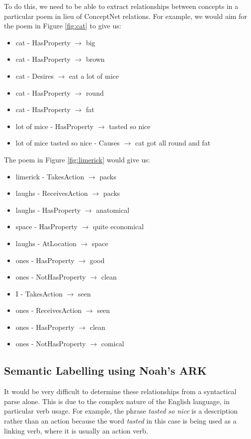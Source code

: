 To do this, we need to be able to extract relationships between concepts in a particular poem in lieu of ConceptNet relations. For example, we would aim for the poem in Figure \ref{fig:cat} to give us: 
\begin{itemize}
\item{cat - HasProperty $\rightarrow$ big}
\item{cat - HasProperty $\rightarrow$ brown}
\item{cat - Desires $\rightarrow$ eat a lot of mice}
\item{cat - HasProperty $\rightarrow$ round}
\item{cat - HasProperty $\rightarrow$ fat}
\item{lot of mice - HasProperty $\rightarrow$ tasted so nice}
\item{lot of mice tasted so nice - Causes $\rightarrow$ cat got all round and fat}
\end{itemize}

The poem in Figure \ref{fig:limerick} would give us:
\begin{itemize}
\item{limerick - TakesAction $\rightarrow$ packs}
\item{laughs - ReceivesAction $\rightarrow$ packs}
\item{laughs - HasProperty $\rightarrow$ anatomical}
\item{space - HasProperty $\rightarrow$ quite economical}
\item{laughs - AtLocation $\rightarrow$ space}
\item{ones - HasProperty $\rightarrow$ good}
\item{ones - NotHasProperty $\rightarrow$ clean}
\item{I - TakesAction $\rightarrow$ seen}
\item{ones - ReceivesAction $\rightarrow$ seen}
\item{ones - HasProperty $\rightarrow$ clean}
\item{ones - NotHasProperty $\rightarrow$ comical}
\end{itemize}


\subsection{Semantic Labelling using Noah's ARK}

It would be very difficult to determine these relationships from a syntactical parse alone. This is due to the complex nature of the English language, in particular verb usage. For example, the phrase \textit{tasted so nice} is a description rather than an action because the word \textit{tasted} in this case is being used as a linking verb, where it is usually an action verb.

